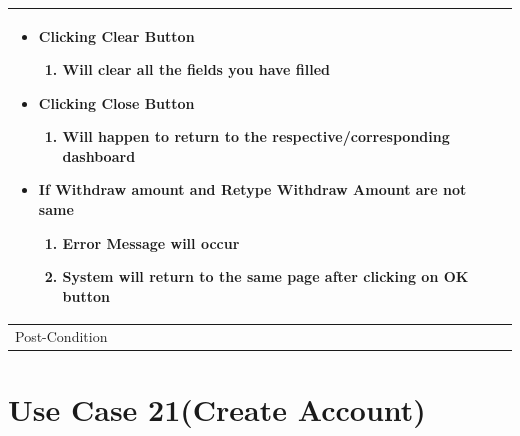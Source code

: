 \documentclass[12pt,a4paper]{report}
\begin{document}
\begin{tabular}{ | m{3cm} | m{12cm}| }
\begin{itemize}
\item Clicking Clear Button
	\begin{enumerate}
		\item Will clear all the fields you have filled
	\end{enumerate}
\item Clicking Close Button
	\begin{enumerate}
	   	 \item	Will happen to return to the respective/corresponding dashboard
	\end{enumerate}
\item If Withdraw amount and Retype Withdraw Amount are not same
	\begin{enumerate}
		\item Error Message will occur
		\item System will return to the same page after clicking on OK button
	\end{enumerate}
\end{itemize}
\\ \hline
Post-Condition &    \\ \hline

\end{tabular}

\section{Use Case 21(Create Account)}
\end{document}
